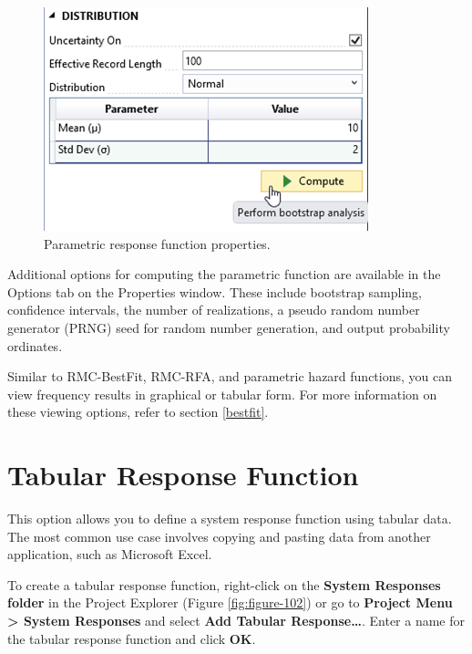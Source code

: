 \documentclass[
]{book}
\begin{document}
\begin{figure}

{\centering \includegraphics{images/figure101} 

}

\caption{Parametric response function properties.}\label{fig:figure-101}
\end{figure}

Additional options for computing the parametric function are available in the Options tab on the Properties window. These include bootstrap sampling, confidence intervals, the number of realizations, a pseudo random number generator (PRNG) seed for random number generation, and output probability ordinates.

Similar to RMC-BestFit, RMC-RFA, and parametric hazard functions, you can view frequency results in graphical or tabular form. For more information on these viewing options, refer to section \ref{bestfit}.

\hypertarget{tabular-response-function}{%
\section{Tabular Response Function}\label{tabular-response-function}}

This option allows you to define a system response function using tabular data. The most common use case involves copying and pasting data from another application, such as Microsoft Excel.

To create a tabular response function, right-click on the \textbf{System Responses folder} in the Project Explorer (Figure \ref{fig:figure-102}) or go to \textbf{Project Menu \textgreater{} System Responses} and select \textbf{Add Tabular Response\ldots{}}. Enter a name for the tabular response function and click \textbf{OK}.
\end{document}
